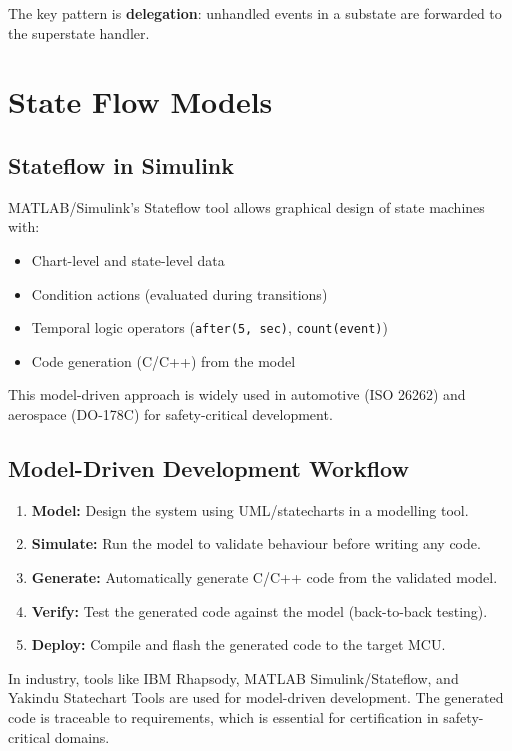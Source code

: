 The key pattern is \textbf{delegation}: unhandled events in a substate are forwarded to the superstate handler.

\section{State Flow Models}
\label{sec:mod:stateflow}

\subsection{Stateflow in Simulink}

MATLAB/Simulink's Stateflow tool allows graphical design of state machines with:
\begin{itemize}[nosep]
  \item Chart-level and state-level data
  \item Condition actions (evaluated during transitions)
  \item Temporal logic operators (\texttt{after(5, sec)}, \texttt{count(event)})
  \item Code generation (C/C++) from the model
\end{itemize}

This model-driven approach is widely used in automotive (ISO 26262) and aerospace (DO-178C) for safety-critical development.

\subsection{Model-Driven Development Workflow}

\begin{enumerate}
  \item \textbf{Model:} Design the system using UML/statecharts in a modelling tool.
  \item \textbf{Simulate:} Run the model to validate behaviour before writing any code.
  \item \textbf{Generate:} Automatically generate C/C++ code from the validated model.
  \item \textbf{Verify:} Test the generated code against the model (back-to-back testing).
  \item \textbf{Deploy:} Compile and flash the generated code to the target MCU.
\end{enumerate}

\begin{practicalNote}
In industry, tools like IBM Rhapsody, MATLAB Simulink/Stateflow, and Yakindu Statechart Tools are used for model-driven development. The generated code is traceable to requirements, which is essential for certification in safety-critical domains.
\end{practicalNote}

